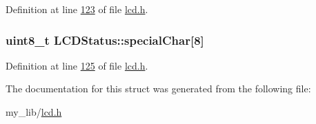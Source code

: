 Definition at line \hyperlink{lcd_8h_source_l00123}{123} of file \hyperlink{lcd_8h_source}{lcd.\-h}.

\hypertarget{struct_l_c_d_status_a8a1571d6288e2ec1ed1114fca2f873be}{
\subsubsection[{special\-Char}]{\setlength{\rightskip}{0pt plus 5cm}uint8\-\_\-t L\-C\-D\-Status\-::special\-Char\mbox{[}8\mbox{]}}}\label{struct_l_c_d_status_a8a1571d6288e2ec1ed1114fca2f873be}


Definition at line \hyperlink{lcd_8h_source_l00125}{125} of file \hyperlink{lcd_8h_source}{lcd.\-h}.



The documentation for this struct was generated from the following file\-:\begin{DoxyCompactItemize}
\item 
my\-\_\-lib/\hyperlink{lcd_8h}{lcd.\-h}\end{DoxyCompactItemize}
